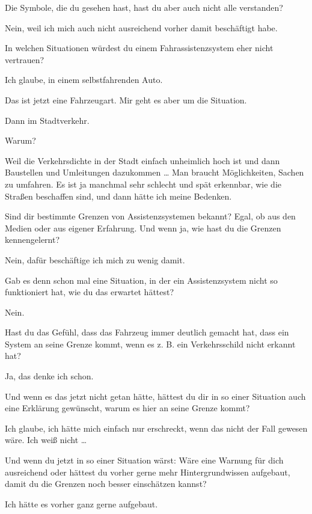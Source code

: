 \interviewerin
Die Symbole, die du gesehen hast, hast du aber auch nicht alle
verstanden?

Nein, weil ich mich auch nicht ausreichend vorher damit beschäftigt
habe.

\interviewerin
In welchen Situationen würdest du einem Fahrassistenzsystem eher nicht
vertrauen?

Ich glaube, in einem selbstfahrenden Auto.

\interviewerin
Das ist jetzt eine Fahrzeugart. Mir geht es aber um die Situation.

Dann im Stadtverkehr.

\interviewerin
Warum?

Weil die Verkehrsdichte in der Stadt einfach unheimlich hoch ist und
dann Baustellen und Umleitungen dazukommen … Man braucht Möglichkeiten,
Sachen zu umfahren. Es ist ja manchmal sehr schlecht und spät erkennbar,
wie die Straßen beschaffen sind, und dann hätte ich meine Bedenken.

\interviewerin
Sind dir bestimmte Grenzen von Assistenzsystemen bekannt? Egal, ob aus
den Medien oder aus eigener Erfahrung. Und wenn ja, wie hast du die
Grenzen kennengelernt?

Nein, dafür beschäftige ich mich zu wenig damit.

\interviewerin
Gab es denn schon mal eine Situation, in der ein Assistenzsystem nicht
so funktioniert hat, wie du das erwartet hättest?

Nein.

\interviewerin
Hast du das Gefühl, dass das Fahrzeug immer deutlich gemacht hat, dass
ein System an seine Grenze kommt, wenn es z. B. ein Verkehrsschild
nicht erkannt hat?

Ja, das denke ich schon.

\interviewerin
Und wenn es das jetzt nicht getan hätte, hättest du dir in so einer
Situation auch eine Erklärung gewünscht, warum es hier an seine Grenze
kommt?

Ich glaube, ich hätte mich einfach nur erschreckt, wenn das nicht der
Fall gewesen wäre. Ich weiß nicht …

\interviewerin
Und wenn du jetzt in so einer Situation wärst: Wäre eine Warnung für
dich ausreichend oder hättest du vorher gerne mehr Hintergrundwissen
aufgebaut, damit du die Grenzen noch besser einschätzen kannst?

Ich hätte es vorher ganz gerne aufgebaut.

